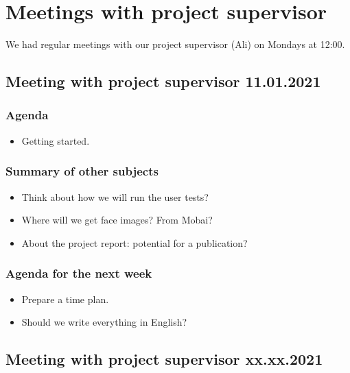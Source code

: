 \chapter{Meetings with project supervisor}

We had regular meetings with our project supervisor (Ali) on Mondays at 12:00. 

\section*{Meeting with project supervisor 11.01.2021}
\subsection*{Agenda}
\begin{itemize}
    \item Getting started.
\end{itemize}

\subsection*{Summary of other subjects}
\begin{itemize}
    \item Think about how we will run the user tests?
    \item Where will we get face images? From Mobai?
    \item About the project report: potential for a publication?
\end{itemize}

\subsection*{Agenda for the next week}
\begin{itemize}
    \item Prepare a time plan.
    \item Should we write everything in English?
\end{itemize}



\section*{Meeting with project supervisor xx.xx.2021}
